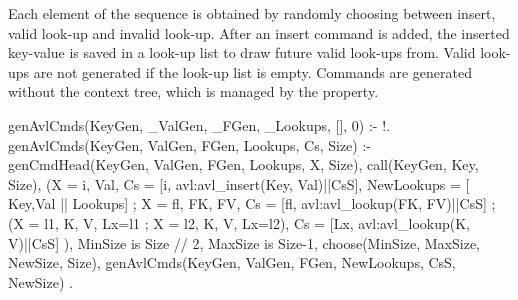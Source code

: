 Each element of the sequence is obtained by randomly choosing between insert, valid look-up and invalid
look-up.
%
After an insert command is added, the inserted key-value is saved in a
look-up list to draw future valid look-ups from.
%
Valid look-ups are not generated if the look-up list is empty.
%
Commands are generated without the context tree, which is managed by
the property.
%
\begin{yapcode}
 genAvlCmds(KeyGen, _ValGen, _FGen,
            _Lookups, [], 0) :- !.
 genAvlCmds(KeyGen, ValGen, FGen,
            Lookups, Cs, Size) :-
   genCmdHead(KeyGen, ValGen, FGen,
              Lookups, X, Size),
   call(KeyGen, Key, Size),
   (X = {i, Val},
    Cs = [{i, avl:avl_insert(Key, Val)}||CsS],
    NewLookups = [ {Key,Val} || Lookups]
   ;
    X = {fl, {FK, FV}},
    Cs = [{fl, avl:avl_lookup(FK, FV)}||CsS]
   ;
    (X = {l1, {K, V}}, Lx=l1
    ; X = {l2, {K, V}}, Lx=l2),
    Cs = [{Lx, avl:avl_lookup(K, V)}||CsS]
   ),
   MinSize is Size // 2, MaxSize is Size-1,
   choose(MinSize, MaxSize, NewSize, Size),
   genAvlCmds(KeyGen, ValGen, FGen,
              NewLookups, CsS, NewSize)
 .
\end{yapcode}


